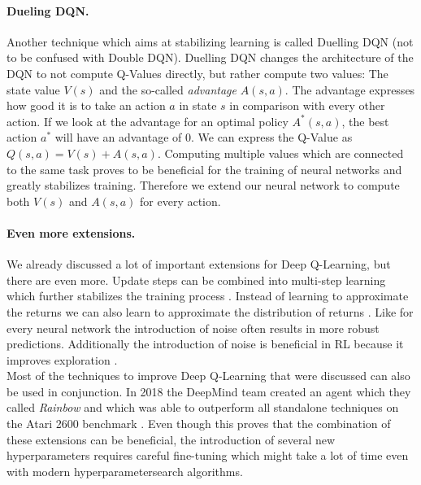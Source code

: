 \paragraph{Dueling DQN.}
Another technique which aims at stabilizing learning is called Duelling DQN \cite{wang2015dueling} (not to be confused with Double DQN). Duelling DQN changes the architecture of the DQN to not compute Q-Values directly, but rather compute two values: The state value $V(s)$ and the so-called \textit{advantage} $A(s, a)$. The advantage expresses how good it is to take an action $a$ in state $s$ in comparison with every other action. If we look at the advantage for an optimal policy $A^*(s, a)$, the best action $a^*$ will have an advantage of 0. We can express the Q-Value as $Q(s, a) = V(s) + A(s, a)$. Computing multiple values which are connected to the same task proves to be beneficial for the training of neural networks and greatly stabilizes training. Therefore we extend our neural network to compute both $V(s)$ and $A(s, a)$ for every action.  %

\paragraph{Even more extensions.}
We already discussed a lot of important extensions for Deep Q-Learning, but there are even more. Update steps can be combined into multi-step learning which further stabilizes the training process \cite{sutton1988learning}. Instead of learning to approximate the returns we can also learn to approximate the distribution of returns \cite{bellemare2017distributional}. Like for every neural network the introduction of noise often results in more robust predictions. Additionally the introduction of noise is beneficial in RL because it improves exploration \cite{fortunato2017noisy, plappert2017parameter}. \\

Most of the techniques to improve Deep Q-Learning that were discussed can also be used in conjunction. In 2018 the DeepMind team created an agent which they called \textit{Rainbow} and which was able to outperform all standalone techniques on the Atari 2600 benchmark \cite{hessel2018rainbow}. Even though this proves that the combination of these extensions can be beneficial, the introduction of several new hyperparameters requires careful fine-tuning which might take a lot of time even with modern hyperparametersearch algorithms. %

